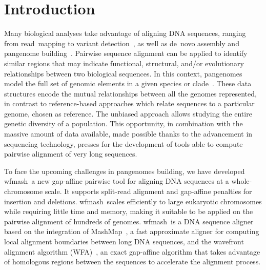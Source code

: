 \documentclass{bioinfo}
\newcommand{\wfmash}{wfmash}
\begin{document}
    \maketitle


    \section{Introduction}

    Many biological analyses take advantage of aligning DNA sequences, ranging from read~mapping
    \citep{22388286, BWA_MEM, 23103880} to variant detection~\citep{21478889}, as well as de~novo
    assembly \citep{19251739} and pangenome building~\citep{33177663, 33066802}. Pairwise sequence alignment
    can be applied to identify similar regions that may indicate functional, structural, and/or evolutionary
    relationships between two biological sequences. In this context, pangenomes model the full set
    of genomic elements in a given species or clade~\citep{32453966}. These data structures encode the mutual
    relationships between all the genomes represented, in contrast to reference-based approaches which
    relate sequences to a particular genome, chosen as reference. The unbiased approach allows studying
    the entire genetic diversity of a population. This opportunity, in combination with the massive amount
    of data available, made possible thanks to the advancement in sequencing technology, presses for the
    development of tools able to compute pairwise alignment of very long sequences.

    To face the upcoming challenges in pangenomes building, we have developed \wfmash\, a new gap-affine
    pairwise tool for aligning DNA sequences at a whole-chromosome scale. It supports split-read alignment
    and gap-affine penalties for insertion and deletions. \wfmash\ scales efficiently to large eukaryotic
    chromosomes while requiring little time and memory, making it suitable to be applied on the pairwise
    alignment of hundreds of genomes. \wfmash\ is a DNA sequence aligner based on the integration of
    MashMap~\citep{30423094}, a fast approximate aligner for computing local alignment boundaries between
    long DNA sequences, and the wavefront alignment algorithm (WFA)~\citep{32915952}, an exact gap-affine algorithm
    that takes advantage of homologous regions between the sequences to accelerate the alignment process.

\end{document}
